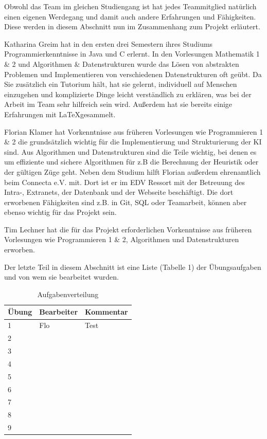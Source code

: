 \documentclass[12pt,a4paper,bibliography=totocnumbered,listof=totocnumbered]{scrartcl}
\begin{document}
    Obwohl das Team im gleichen Studiengang ist hat jedes Teammitglied natürlich einen eigenen Werdegang und damit auch andere Erfahrungen und Fähigkeiten. Diese werden in diesem Abschnitt nun im Zusammenhang zum Projekt erläutert.

    Katharina Greim hat in den ersten drei Semestern ihres Studiums Programmierkenntnisse in Java und C erlernt. In den Vorlesungen Mathematik 1 \& 2 und Algorithmen \& Datenstrukturen wurde das Lösen von abstrakten Problemen und Implementieren von verschiedenen Datenstrukturen oft geübt. Da Sie zusätzlich ein Tutorium hält, hat sie gelernt, individuell auf Menschen einzugehen und komplizierte Dinge leicht verständlich zu erklären, was bei der Arbeit im Team sehr hilfreich sein wird. Außerdem hat sie bereits einige Erfahrungen mit \LaTeX\quad gesammelt.

    Florian Klamer hat Vorkenntnisse aus früheren Vorlesungen wie Programmieren 1 \& 2 die grundsätzlich wichtig für die Implementierung und Strukturierung der KI sind. Aus Algorithmen und Datenstrukturen sind die Teile wichtig, bei denen es um effiziente und sichere Algorithmen für z.B die Berechnung der Heuristik oder der gültigen Züge geht. Neben dem Studium hilft Florian außerdem ehrenamtlich beim Connecta e.V. mit. Dort ist er im EDV Ressort mit der Betreuung des Intra-, Extranets, der Datenbank und der Webseite beschäftigt. Die dort erworbenen Fähigkeiten sind z.B. in Git, SQL oder Teamarbeit, können aber ebenso wichtig für das Projekt sein.

    Tim Lechner hat die für das Projekt erforderlichen Vorkenntnisse aus früheren Vorlesungen wie Programmieren 1 \& 2, Algorithmen und Datenstrukturen erworben.

    Der letzte Teil in diesem Abschnitt ist eine Liste (Tabelle 1) der Übungsaufgaben und von wem sie bearbeitet wurden.

    \begin{table}[]
        \centering
        \caption{Aufgabenverteilung}
        \label{my-label}
        \begin{tabular}{|l|l|l|}
            \hline
            Übung & Bearbeiter & Kommentar \\ \hline
            1 & Flo & Test      \\ \hline
            2 & &           \\ \hline
            3 & &           \\ \hline
            4& &           \\ \hline
            5& &           \\ \hline
            6& &           \\ \hline
            7& &           \\ \hline
            8& &           \\ \hline
            9& &           \\ \hline
        \end{tabular}
    \end{table}
\end{document}
